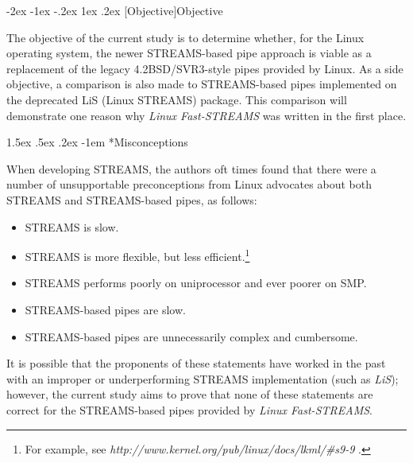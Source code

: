 \documentclass[letterpaper,final,notitlepage,twocolumn,10pt,twoside]{article}
\makeatletter
\let\large\normalsize
\let\normalsize\small
\let\small\footnotesize
\let\footnotesize\scriptsize
\let\scriptsize\tiny
\renewcommand\section{\@startsection {section}{1}{\z@}%
                                   {-2ex \@plus -1ex \@minus -.2ex}%
                                   {1ex \@plus .2ex}%
                                   {\normalfont\large\bfseries}}
\renewcommand\paragraph{\@startsection{paragraph}{4}{\z@}%
                                    {1.5ex \@plus .5ex \@minus .2ex}%
                                    {-1em}%
                                    {\normalfont\normalsize\bfseries\slshape}}
\makeatother
\begin{document}
\section[Objective]{Objective}

The objective of the current study is to determine whether, for the Linux
operating system, the newer STREAMS-based pipe approach is viable as a
replacement of the legacy 4.2BSD/SVR3-style pipes provided by Linux.  As a
side objective, a comparison is also made to STREAMS-based pipes implemented
on the deprecated LiS (Linux STREAMS) package.  This comparison will
demonstrate one reason why \textsl{Linux Fast-STREAMS} was written in the
first place.

\paragraph*{Misconceptions}

When developing STREAMS, the authors oft times found that there were a number
of unsupportable preconceptions from Linux advocates about both STREAMS and
STREAMS-based pipes, as follows:

\begin{itemize}

\item STREAMS is slow.

\item STREAMS is more flexible, but less efficient.\footnote{For example, see
\textit{http://www.kernel.org/pub/linux/docs/lkml/\#s9-9} .}

\item STREAMS performs poorly on uniprocessor and ever poorer on SMP.

\item STREAMS-based pipes are slow.

\item STREAMS-based pipes are unnecessarily complex and cumbersome.

\end{itemize}

It is possible that the proponents of these statements have worked in the past
with an improper or underperforming STREAMS implementation (such as
\textsl{LiS}); however, the current study aims to prove that none of these
statements are correct for the STREAMS-based pipes provided by \textsl{Linux
Fast-STREAMS}.
\end{document}
